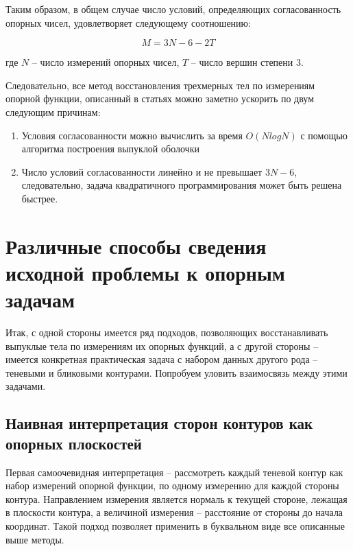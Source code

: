 \documentclass[a4paper, 12pt, titlepage]{article}
\theoremstyle{definition}
\theoremstyle{plain}
\theoremstyle{plain}
\begin{document}
Таким образом, в общем случае число условий, определяющих согласованность
опорных чисел, удовлетворяет следующему соотношению:

\begin{equation}
 M = 3 N - 6 - 2 T
\end{equation}

где $N$ -- число измерений опорных чисел, $T$ -- число вершин степени $3$.

Следовательно, все метод восстановления трехмерных тел по измерениям опорной
функции, описанный в статьях \cite{journals/jmiv/KarlKVW96,
conf/spie/GregorR2001, journals/ijist/GregorR2002} можно заметно ускорить по
двум следующим причинам:

\begin{enumerate}
 \item Условия согласованности можно вычислить за время $O(N log N)$ с
 помощью алгоритма построения выпуклой оболочки
 \item Число условий согласованности линейно и не превышает $3 N - 6$,
 следовательно, задача квадратичного программирования может быть решена
 быстрее.
\end{enumerate}


\section{Различные способы сведения исходной проблемы к опорным задачам}

Итак, с одной стороны имеется ряд подходов, позволяющих восстанавливать
выпуклые тела по измерениям их опорных функций, а с другой стороны -- имеется
конкретная практическая задача с набором данных другого рода -- теневыми и
бликовыми контурами. Попробуем уловить взаимосвязь между этими задачами.

\subsection{Наивная интерпретация сторон контуров как опорных плоскостей}

Первая самоочевидная интерпретация -- рассмотреть каждый теневой контур как
набор измерений опорной функции, по одному измерению для каждой стороны
контура. Направлением измерения является нормаль к текущей стороне, лежащая в
плоскости контура, а величиной измерения -- расстояние от стороны до начала
координат. Такой подход позволяет применить в буквальном виде все описанные
выше методы.
\end{document}
